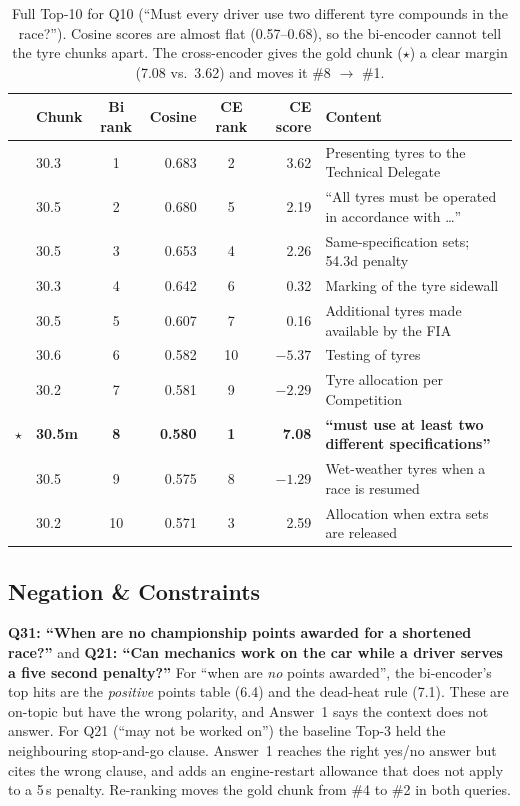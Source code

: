 \documentclass[11pt,a4paper]{article}
\begin{document}
\begin{table}[H]
\centering\small
\begin{tabular}{@{}clcrcrl@{}}
\toprule
 & Chunk & Bi rank & Cosine & CE rank & CE score & Content \\
\midrule
 & 30.3 & 1 & 0.683 & 2  & 3.62  & Presenting tyres to the Technical Delegate \\
 & 30.5 & 2 & 0.680 & 5  & 2.19  & ``All tyres must be operated in accordance with \ldots'' \\
 & 30.5 & 3 & 0.653 & 4  & 2.26  & Same-specification sets; 54.3d penalty \\
 & 30.3 & 4 & 0.642 & 6  & 0.32  & Marking of the tyre sidewall \\
 & 30.5 & 5 & 0.607 & 7  & 0.16  & Additional tyres made available by the FIA \\
 & 30.6 & 6 & 0.582 & 10 & $-5.37$ & Testing of tyres \\
 & 30.2 & 7 & 0.581 & 9  & $-2.29$ & Tyre allocation per Competition \\
$\star$ & \textbf{30.5m} & \textbf{8} & \textbf{0.580} & \textbf{1} & \textbf{7.08} & \textbf{``must use at least two different specifications''} \\
 & 30.5 & 9 & 0.575 & 8  & $-1.29$ & Wet-weather tyres when a race is resumed \\
 & 30.2 & 10 & 0.571 & 3 & 2.59  & Allocation when extra sets are released \\
\bottomrule
\end{tabular}
\caption{Full Top-10 for Q10 (``Must every driver use two different tyre compounds in the race?''). Cosine scores
are almost flat (0.57--0.68), so the bi-encoder cannot tell the tyre chunks apart. The cross-encoder gives the gold
chunk ($\star$) a clear margin (7.08 vs.\ 3.62) and moves it \#8 $\to$ \#1.}
\label{tab:q10}
\end{table}

\subsection{Negation \& Constraints}
\textbf{Q31: ``When are no championship points awarded for a shortened race?''} and \textbf{Q21: ``Can mechanics
work on the car while a driver serves a five second penalty?''} For ``when are \emph{no} points awarded'', the bi-encoder's top hits
are the \emph{positive} points table (6.4) and the dead-heat rule (7.1). These are on-topic but have the wrong
polarity, and Answer~1 says the context does not answer. For Q21 (``may not be worked on'') the baseline Top-3 held
the neighbouring stop-and-go clause. Answer~1 reaches the right yes/no answer but cites the wrong clause, and adds
an engine-restart allowance that does not apply to a 5\,s penalty. Re-ranking moves the gold chunk from \#4 to \#2 in both queries.
\end{document}
